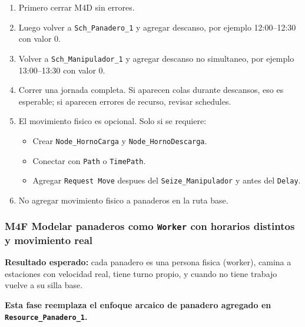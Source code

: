 \documentclass[11pt]{article}
\newcommand{\simio}[1]{\texttt{#1}}
\begin{document}
\begin{enumerate}
  \item Primero cerrar M4D sin errores.
  \item Luego volver a \simio{Sch\_Panadero\_1} y agregar descanso, por ejemplo 12:00--12:30 con valor 0.
  \item Volver a \simio{Sch\_Manipulador\_1} y agregar descanso no simultaneo, por ejemplo 13:00--13:30 con valor 0.
  \item Correr una jornada completa. Si aparecen colas durante descansos, eso es esperable; si aparecen errores de recurso, revisar schedules.
  \item El movimiento fisico es opcional. Solo si se requiere:
  \begin{itemize}
    \item Crear \simio{Node\_HornoCarga} y \simio{Node\_HornoDescarga}.
    \item Conectar con \simio{Path} o \simio{TimePath}.
    \item Agregar \simio{Request Move} despues del \simio{Seize\_Manipulador} y antes del \simio{Delay}.
  \end{itemize}
  \item No agregar movimiento fisico a panaderos en la ruta base.
\end{enumerate}

\subsubsection{M4F Modelar panaderos como \simio{Worker} con horarios distintos y movimiento real}
\textbf{Resultado esperado:} cada panadero es una persona fisica (worker), camina a estaciones con velocidad real, tiene turno propio, y cuando no tiene trabajo vuelve a su silla base.

\textbf{Esta fase reemplaza el enfoque arcaico de panadero agregado en \simio{Resource\_Panadero\_1}.}
\end{document}
